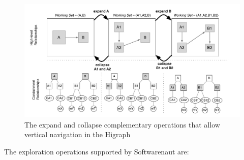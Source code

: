 \documentclass[preprint,12pt]{elsarticle}
\begin{document}
\begin{figure}[ht]
\begin{center}
\includegraphics[width=\linewidth]{SnautSequence}
\caption{The expand and collapse complementary operations that allow vertical navigation in the Higraph}
\label{}
\end{center}
\end{figure}

The exploration operations supported by Softwarenaut are:
\end{document}
